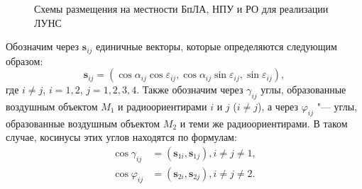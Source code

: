\documentclass[../main.tex]{subfiles}
\begin{document}
\begin{figure}[htbp]
    \begin{center}


    \caption{Схемы размещения на местности БпЛА, НПУ и РО для реализации ЛУНС}
    \label{figure:pic2}
    \end{center}
\end{figure}

Обозначим через $\mathbf{s}_{ij}$ единичные векторы, которые определяются следующим образом:
\begin{equation}
    \mathbf{s}_{ij} = \left(\cos\alpha_{ij} \cos\varepsilon_{ij}, \cos\alpha_{ij} \sin\varepsilon_{ij}, \sin\varepsilon_{ij}\right),
\end{equation}
где $i \ne j$, $i = 1,2$, $j = 1,2,3,4$. Также обозначим через $\gamma_{ij}$ углы, образованные воздушным объектом $M_1$ и
радиоориентирами $i$ и $j$ ($i \ne j$), а через $\varphi_{ij}$ "--- углы, образованные воздушным объектом $M_2$ и теми же
радиоориентирами. В таком случае, косинусы этих углов находятся по формулам:
\begin{align*}
    \cos\gamma_{ij} &= \left(\mathbf{s}_{1i}, \mathbf{s}_{1j}\right), i \ne j \ne 1, \\
    \cos\varphi_{ij} &= \left(\mathbf{s}_{2i}, \mathbf{s}_{2j}\right), i \ne j \ne 2.
\end{align*}
\end{document}
